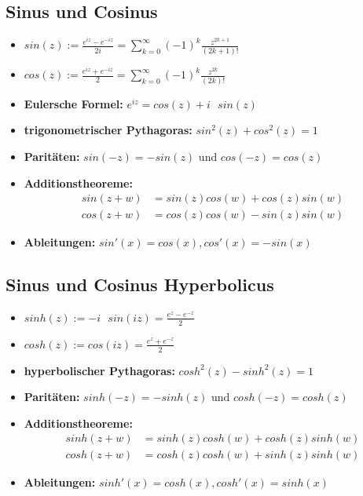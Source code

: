 \documentclass[german]{latex4ei/latex4ei_sheet}
\begin{document}
\begin{sectionbox}
	\subsection{Sinus und Cosinus}
	\begin{itemize}
		 
	\item $sin(z):=\frac{e^{iz}-e^{-iz}}{2i}=\sum\limits_{k=0}^{\infty}(-1)^k \frac{z^{2k+1}}{(2k+1)!}$
\item	$cos(z):=\frac{e^{iz}+e^{-iz}}{2}=\sum\limits_{k=0}^{\infty}(-1)^k \frac{z^{2k}}{(2k)!}$
		
	\item \textbf{Eulersche Formel: }$e^{iz}=cos(z)+i \text{ }sin(z)$
	\item \textbf{trigonometrischer Pythagoras: }$sin^2(z)+cos^2(z)=1$
	\item \textbf{Paritäten: } $sin(-z)=-sin(z) \text{ und } cos(-z)=cos(z)$
	\item \textbf{Additionstheoreme:} \begin{align*}
		sin(z+w) &= sin(z)cos(w)+cos(z)sin(w)\\
		cos(z+w) &= cos(z)cos(w)-sin(z)sin(w)
		\end{align*}
\item \textbf{Ableitungen: } $sin'(x)=cos(x), cos'(x)=-sin(x)$	

	
	\end{itemize}

		
		


\end{sectionbox}

\begin{sectionbox}
	\subsection{Sinus und Cosinus Hyperbolicus}
	\begin{itemize}
		\item $sinh(z):=-i \text{  } sin(iz)=\frac{e^z-e^{-z}}{2}$
		\item $cosh(z):=cos(iz)=\frac{e^z+e^{-z}}{2}$
	    \item \textbf{hyperbolischer Pythagoras: }$cosh^2(z)-sinh^2(z)=1$
	    \item \textbf{Paritäten: } $sinh(-z)=-sinh(z) \text{ und } cosh(-z)=cosh(z)$
     	\item \textbf{Additionstheoreme:} \begin{align*}
		sinh(z+w) &= sinh(z)cosh(w)+cosh(z)sinh(w)\\
		cosh(z+w) &= cosh(z)cosh(w)+sinh(z)sinh(w)
		\end{align*}
		\item \textbf{Ableitungen: } $sinh'(x)= cosh(x), cosh'(x) = sinh(x)$

	\end{itemize}

\end{sectionbox}
\end{document}
